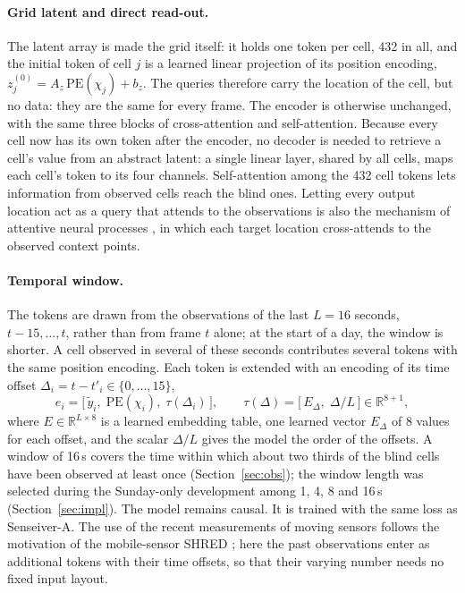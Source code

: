 \documentclass[english, 12pt, a4paper, elec, utf8, a-2b, online]{aaltothesis}
\begin{document}
\paragraph{Grid latent and direct read-out.}
The latent array is made the grid itself: it holds one token per cell, 432 in
all, and the initial token of cell $j$ is a learned linear projection of its
position encoding, $z^{(0)}_j = A_z\, \mathrm{PE}(\chi_j) + b_z$. The queries
therefore carry the location of the cell, but no data: they are the same for
every frame. The encoder is otherwise unchanged, with the same three blocks of
cross-attention and self-attention. Because every cell now has its own token
after the encoder, no decoder is needed to retrieve a cell's value from an
abstract latent: a single linear layer, shared by all cells, maps each cell's
token to its four channels. Self-attention among the 432 cell tokens lets
information from observed cells reach the blind ones. Letting every output
location act as a query that attends to the observations is also the mechanism
of attentive neural processes \cite{kim2019anp}, in which each target location
cross-attends to the observed context points.

\paragraph{Temporal window.}
The tokens are drawn from the observations of the last $L = 16$ seconds,
$t-15, \dots, t$, rather than from frame $t$ alone; at the start of a day, the
window is shorter. A cell observed in several of these seconds contributes
several tokens with the same position encoding. Each token is extended with an
encoding of its time offset $\Delta_i = t - t'_i \in \{0, \dots, 15\}$,
\begin{equation}
	e_i = \big[\, \tilde{y}_i,\; \mathrm{PE}(\chi_i),\; \tau(\Delta_i) \,\big],
	\qquad \tau(\Delta) = \big[\, E_{\Delta},\; \Delta / L \,\big] \in \mathbb{R}^{8+1},
	\label{eq:sv_token_g}
\end{equation}
where $E \in \mathbb{R}^{L \times 8}$ is a learned embedding table, one learned
vector $E_{\Delta}$ of 8 values for each offset, and the
scalar $\Delta / L$ gives the model the order of the offsets. A window of
16\,s covers the time within which about two thirds of the blind cells have
been observed at least once (Section~\ref{sec:obs}); the window length was
selected during the Sunday-only development among 1, 4, 8 and 16\,s
(Section~\ref{sec:impl}). The model remains causal. It is trained with the same
loss as Senseiver\nobreakdash-A. The use of the recent measurements of moving sensors
follows the motivation of the mobile-sensor SHRED \cite{ebers2024mobileshred};
here the past observations enter as additional tokens with their time offsets,
so that their varying number needs no fixed input layout.
\end{document}
